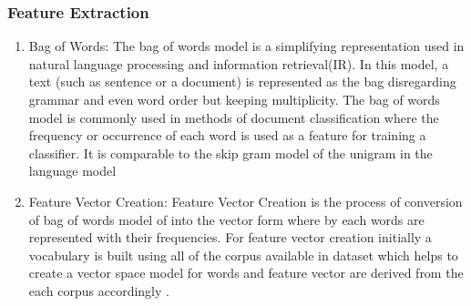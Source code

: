 \subsubsection{Feature Extraction}
\begin{enumerate}
\item Bag of Words:
 The bag of words model is a simplifying representation used in natural language processing and information retrieval(IR). In this model, a text (such as sentence or a document) is represented as the bag disregarding grammar and even word order but keeping multiplicity. The bag of words model is commonly used in methods of document classification where the frequency or occurrence of each word is used as a feature for training a classifier. It is comparable to the skip gram model of the unigram in the language model \cite{vector}


\item Feature Vector Creation: 
 Feature Vector Creation is the process of conversion of bag of words model of into the vector form where by each words are represented with their frequencies. For feature vector creation initially a vocabulary is built using all of the corpus available in dataset which helps to create a vector space model for words and feature vector are derived from the each corpus accordingly \cite{vector}.
\end{enumerate}

